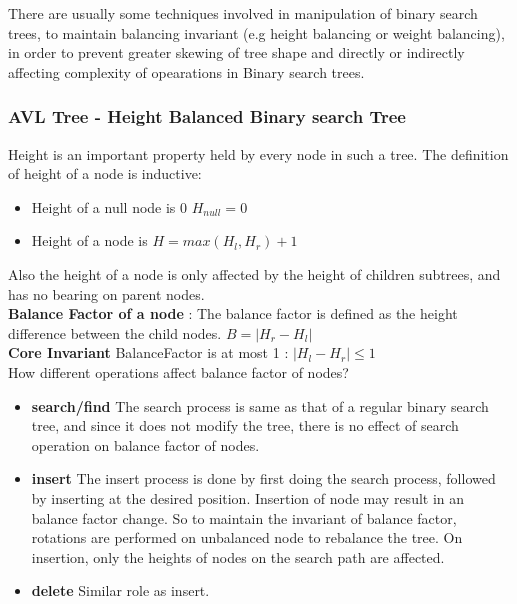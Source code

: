 \documentclass[10pt,a4paper]{article}
\begin{document}
	There are usually some techniques involved in manipulation
	of binary search trees, to maintain balancing invariant (e.g height balancing or weight balancing), in order to prevent greater skewing of tree shape and directly or indirectly affecting complexity of opearations in Binary search trees.
	
	\subsubsection[AVL Tree]{AVL Tree - Height Balanced Binary search Tree}
	
	Height is an important property held by every node in such a tree. 
	The definition of height of a node is inductive:
	\begin{itemize}
		\item Height of a null node is 0 $H_{null} = 0$
		\item Height of a node is $H = max(H_l, H_r) + 1$
	\end{itemize}
	Also the height of a node is only affected by the height of children subtrees, and has no bearing on parent nodes.\\
	
	\textbf{Balance Factor of a node} : The balance factor is defined as the height difference between the child nodes. $B = |H_r - H_l|$\\
	
	\textbf{Core Invariant} BalanceFactor is at most 1 : $|H_l - H_r| \le 1$\\
	
	How different operations affect balance factor of nodes?
	
	\begin{itemize}
		\item \textbf{search/find} The search process is same as that of a regular binary search tree, and since it does not modify the tree, there is no effect of search operation on balance factor of nodes.
		
		\item \textbf{insert} The insert process is done by first doing the search process, followed by inserting at the desired position. Insertion of node may result in an balance factor change. So to maintain the invariant of balance factor, rotations are performed on unbalanced node to rebalance the tree. On insertion, only the heights of nodes on the search path are affected.
		
		\item \textbf{delete} Similar role as insert.
	\end{itemize}
	
\end{document}
